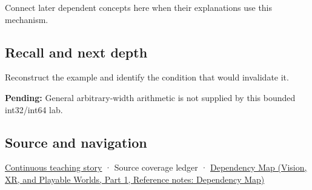 \hypertarget{appendix-3333db47830f-used-by}{}

Connect later dependent concepts here when their explanations use this mechanism.

\subsection{Recall and next depth}\label{appendix-3333db47830f-recall-and-next-depth}

\hypertarget{appendix-3333db47830f-recall-and-next-depth}{}

Reconstruct the example and identify the condition that would invalidate it.

\textbf{Pending:} General arbitrary-width arithmetic is not supplied by this bounded int32/int64 lab.

\subsection{Source and navigation}\label{appendix-3333db47830f-source-and-navigation}

\hypertarget{appendix-3333db47830f-source-and-navigation}{}

\hyperref[01-foundations-i-ch001-choosing-what-information-to-keep]{Continuous teaching story} · {Source coverage ledger} · \href{../07-Vision-XR-and-Playable-Worlds-P01/main.pdf\#nameddest=appendix-4ad47bdd269a}{Dependency Map (Vision, XR, and Playable Worlds, Part 1, Reference notes: Dependency Map)}
